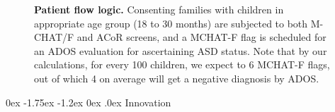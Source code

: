 \documentclass[onecolumn, compsoc,11pt]{IEEEtran}
\makeatletter
\renewcommand\subsection{\@startsection {subsection}{2}{\z@}%
                                   {0ex \@plus -1.75ex \@minus -1.2ex}%
                                   {0ex \@plus.0ex}%
                                   {\fontsize{11}{11}\selectfont\bfseries\sffamily\color{black}}}
\renewcommand{\captionN}[1]{\caption{\color{CadetBlue4!80!black} \sffamily \fontsize{9}{10}\selectfont #1  }}
\def\ZERO{ACoR\xspace}
\makeatother
\begin{document}
\begin{figure}[t]
\begin{center}
\tikzexternaldisable
{}
\end{center}
\vspace{-10pt}

\captionN{\textbf{Patient flow logic.} Consenting families with children in appropriate age group (18 to 30 months) are subjected to both M-CHAT/F and \ZERO screens, and a MCHAT-F flag is scheduled for an ADOS evaluation for ascertaining ASD status. Note that by our calculations, for every 100 children, we expect to 6 MCHAT-F flags, out of which 4 on average will get a negative diagnosis by ADOS.}\label{figflow}
\end{figure}

 \subsection{Innovation}
\end{document}
